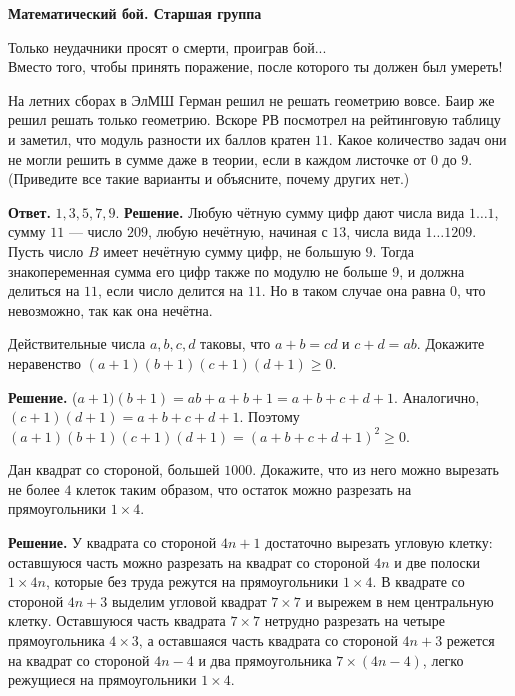 \centerline{\bf \Huge Математический бой. Старшая группа}

\begin{flushright}
        \scriptsize{Только неудачники просят о смерти, проиграв бой... \\Вместо того, чтобы принять поражение, после которого ты должен был умереть!}
\end{flushright}

 На летних сборах в ЭлМШ Герман решил не решать геометрию вовсе. Баир же решил решать только геометрию. Вскоре РВ посмотрел на рейтинговую таблицу и заметил, что модуль разности их баллов кратен $11$. Какое количество задач они не могли решить в сумме даже в теории, если в каждом листочке от $0$ до $9$. (Приведите все такие варианты и объясните, почему других нет.)

\noindent
\textbf{Ответ.} $1, 3, 5, 7, 9.$ \textbf{Решение.} Любую чётную сумму цифр дают числа вида $1\ldots1$, сумму $11$ --- число $209$, любую нечётную, начиная с $13$, числа вида $1\ldots 1209.$ Пусть число $B$ имеет нечётную сумму цифр, не большую $9$. Тогда знакопеременная сумма его цифр также по модулю не больше 9, и должна делиться на $11$, если число делится на $11$. Но в таком случае она равна $0$, что невозможно, так как она нечётна.


 Действительные числа $a, b, c, d$ таковы, что $a+b = cd$ и $c+d = ab.$ Докажите неравенство $(a+1)(b+1)(c+1)(d+1) \geq 0$.

\noindent
\textbf{Решение.}
($a+1)(b+1) = ab+a+b+1 = a+b+c+d+1.$ Аналогично, $(c+1)(d+1) = a+b+c+d+1.$ Поэтому $(a+1)(b+1)(c+1)(d+1) = (a+b+c+d+1)^2 \geq 0.$


Дан квадрат со стороной, большей $1000$. Докажите, что из него можно вырезать не более $4$ клеток таким образом, что остаток можно разрезать на прямоугольники $1\times4$.

\noindent
\textbf{Решение.}
У квадрата со стороной $4n+1$ достаточно вырезать угловую клетку: оставшуюся часть можно разрезать на квадрат со стороной $4n$ и две полоски $1\times4n$, которые без труда режутся на прямоугольники $1\times4.$ В квадрате со стороной $4n+3$ выделим угловой квадрат $7\times7$ и вырежем в нем центральную клетку. Оставшуюся часть квадрата $7\times7$ нетрудно разрезать на четыре прямоугольника $4\times3$, а оставшаяся часть квадрата со стороной $4n+3$ режется на квадрат со стороной $4n-$4 и два прямоугольника $7\times(4n-4)$, легко режущиеся на прямоугольники $1\times4.$

